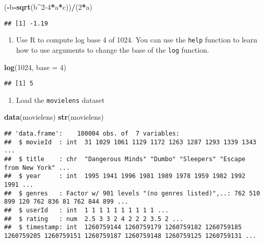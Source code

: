 \documentclass[
]{article}
\newenvironment{Shaded}{\begin{snugshade}}{\end{snugshade}}
\newcommand{\DataTypeTok}[1]{\textcolor[rgb]{0.13,0.29,0.53}{#1}}
\newcommand{\DecValTok}[1]{\textcolor[rgb]{0.00,0.00,0.81}{#1}}
\newcommand{\KeywordTok}[1]{\textcolor[rgb]{0.13,0.29,0.53}{\textbf{#1}}}
\newcommand{\NormalTok}[1]{#1}
\newcommand{\OperatorTok}[1]{\textcolor[rgb]{0.81,0.36,0.00}{\textbf{#1}}}
\providecommand{\tightlist}{%
  \setlength{\itemsep}{0pt}\setlength{\parskip}{0pt}}
\begin{document}
\begin{Shaded}
\begin{Highlighting}[]
\NormalTok{(}\OperatorTok{-}\NormalTok{b}\OperatorTok{-}\KeywordTok{sqrt}\NormalTok{(b}\OperatorTok{^}\DecValTok{2-4}\OperatorTok{*}\NormalTok{a}\OperatorTok{*}\NormalTok{c))}\OperatorTok{/}\NormalTok{(}\DecValTok{2}\OperatorTok{*}\NormalTok{a)}
\end{Highlighting}
\end{Shaded}

\begin{verbatim}
## [1] -1.19
\end{verbatim}

\begin{enumerate}
\def\labelenumi{\arabic{enumi}.}
\setcounter{enumi}{1}
\tightlist
\item
  Use R to compute log base 4 of 1024. You can use the \texttt{help}
  function to learn how to use arguments to change the base of the
  \texttt{log} function.
\end{enumerate}

\begin{Shaded}
\begin{Highlighting}[]
\KeywordTok{log}\NormalTok{(}\DecValTok{1024}\NormalTok{, }\DataTypeTok{base =} \DecValTok{4}\NormalTok{)}
\end{Highlighting}
\end{Shaded}

\begin{verbatim}
## [1] 5
\end{verbatim}

\begin{enumerate}
\def\labelenumi{\arabic{enumi}.}
\setcounter{enumi}{2}
\tightlist
\item
  Load the \texttt{movielens} dataset
\end{enumerate}

\begin{Shaded}
\begin{Highlighting}[]
\KeywordTok{data}\NormalTok{(movielens)}
\KeywordTok{str}\NormalTok{(movielens)}
\end{Highlighting}
\end{Shaded}

\begin{verbatim}
## 'data.frame':    100004 obs. of  7 variables:
##  $ movieId  : int  31 1029 1061 1129 1172 1263 1287 1293 1339 1343 ...
##  $ title    : chr  "Dangerous Minds" "Dumbo" "Sleepers" "Escape from New York" ...
##  $ year     : int  1995 1941 1996 1981 1989 1978 1959 1982 1992 1991 ...
##  $ genres   : Factor w/ 901 levels "(no genres listed)",..: 762 510 899 120 762 836 81 762 844 899 ...
##  $ userId   : int  1 1 1 1 1 1 1 1 1 1 ...
##  $ rating   : num  2.5 3 3 2 4 2 2 2 3.5 2 ...
##  $ timestamp: int  1260759144 1260759179 1260759182 1260759185 1260759205 1260759151 1260759187 1260759148 1260759125 1260759131 ...
\end{verbatim}
\end{document}
